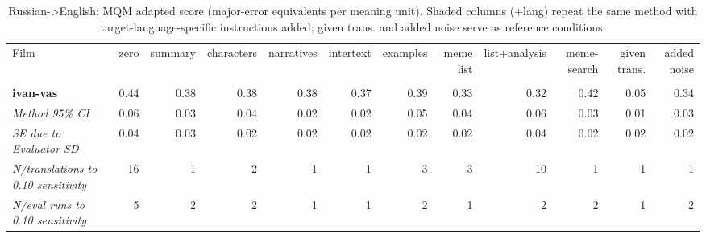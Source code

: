\begin{table}[ht]
\centering
\begin{adjustbox}{width=\textwidth}
\begin{tabular}{lrrrrrrrrr|rr}
Film & zero & summary & characters & narratives & intertext & examples & meme list & list+analysis & meme-search & \multicolumn{1}{|r}{given trans.} & added noise \\
 &  &  &  &  &  &  &  &  &  &  &  \\
\hline
\textbf{ivan-vas} & 0.44 & 0.38 & 0.38 & 0.38 & 0.37 & 0.39 & 0.33 & 0.32 & 0.42 & 0.05 & 0.34 \\

\emph{Method 95\% CI} & 0.06 & 0.03 & 0.04 & 0.02 & 0.02 & 0.05 & 0.04 & 0.06 & 0.03 & 0.01 & 0.03 \\

\emph{SE due to Evaluator SD} & 0.04 & 0.03 & 0.02 & 0.02 & 0.02 & 0.02 & 0.02 & 0.04 & 0.02 & 0.02 & 0.02 \\

\emph{N/translations to 0.10 sensitivity} & 16 & 1 & 2 & 1 & 1 & 3 & 3 & 10 & 1 & 1 & 1 \\

\emph{N/eval runs to 0.10 sensitivity} & 5 & 2 & 2 & 1 & 1 & 2 & 1 & 2 & 2 & 1 & 2 \\

\hline
\end{tabular}
\end{adjustbox}
\caption{Russian->English: MQM adapted score (major-error equivalents per meaning unit). Shaded columns (+lang) repeat the same method with target-language-specific instructions added; given trans. and added noise serve as reference conditions.}
\label{tab:mqm-method-comparison}
\end{table}
